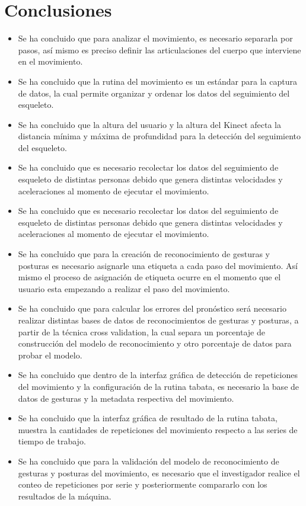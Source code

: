 \documentclass[twoside,twocolumn]{article}
\begin{document}
\section{Conclusiones}
\begin{itemize}
\item Se ha concluido que para analizar el movimiento, es necesario separarla por pasos, así mismo es preciso definir las articulaciones del cuerpo que interviene en el movimiento.
\item Se ha concluido que la rutina del movimiento es un estándar para la captura de datos, la cual  permite organizar y ordenar los datos del seguimiento del esqueleto.
\item Se ha concluido que la altura del usuario y la altura del Kinect afecta la distancia mínima y máxima de profundidad para la detección del seguimiento del esqueleto.
\item Se ha concluido que es necesario recolectar los datos del seguimiento de esqueleto de distintas personas debido que genera distintas velocidades y aceleraciones al momento de ejecutar el movimiento.
\item Se ha concluido que es necesario recolectar los datos del seguimiento de esqueleto de distintas personas debido que genera distintas velocidades y aceleraciones al momento de ejecutar el movimiento.
\item Se ha concluido que para la creación de reconocimiento de gesturas y posturas es necesario asignarle una etiqueta a cada paso del movimiento. Así mismo el proceso de asignación de etiqueta ocurre en el momento que el usuario esta empezando a realizar el paso del movimiento.
\item Se ha concluido que para calcular los errores del pronóstico será necesario realizar distintas bases de datos de reconocimientos  de gesturas y posturas, a partir de la técnica cross validation, la cual separa un porcentaje de construcción del modelo de reconocimiento y otro porcentaje de datos para probar el modelo.
\item Se ha concluido que dentro de la interfaz gráfica de detección de repeticiones del movimiento y la configuración de la rutina tabata, es necesario la base de datos de gesturas y la metadata respectiva del movimiento.
\item Se ha concluido que la interfaz gráfica de resultado de la rutina tabata, muestra la cantidades de repeticiones del movimiento respecto a las series de tiempo de trabajo.
\item Se ha concluido que para la validación del modelo de reconocimiento de gesturas y posturas del movimiento, es necesario que el investigador realice el conteo de repeticiones por serie y posteriormente compararlo con los resultados de la máquina.
\end{itemize}



\end{document}
